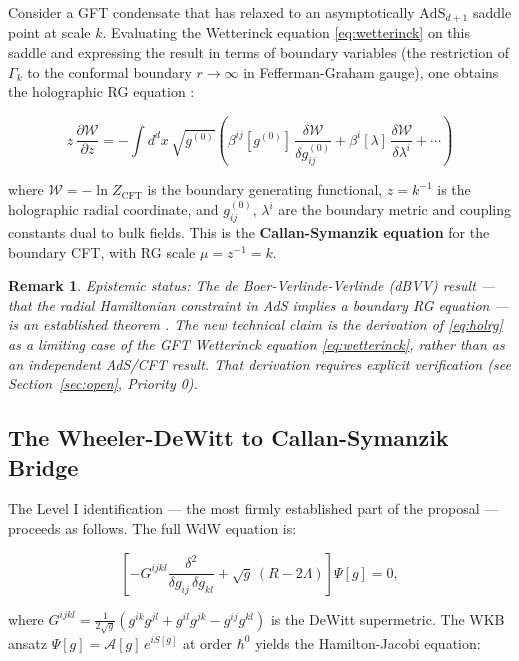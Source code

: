\documentclass[12pt,a4paper]{article}
\newtheorem{remark}{Remark}
\newcommand{\AdS}{\mathrm{AdS}}
\newcommand{\CFT}{\mathrm{CFT}}
\newcommand{\Gk}{\Gamma_k}
\begin{document}
Consider a GFT condensate that has relaxed to an asymptotically
$\AdS_{d+1}$ saddle point at scale $k$.
Evaluating the Wetterinck equation \eqref{eq:wetterinck} on this saddle
and expressing the result in terms of boundary variables
(the restriction of $\Gk$ to the conformal boundary $r\to\infty$ in
Fefferman-Graham gauge), one obtains the holographic RG equation
\cite{skenderis2002}:

\begin{equation}
\label{eq:holrg}
\boxed{
z\,\frac{\partial\mathcal{W}}{\partial z}
= -\int d^dx\,\sqrt{g^{(0)}}\!\left(
\beta^{ij}[g^{(0)}]\,\frac{\delta\mathcal{W}}{\delta g^{(0)}_{ij}}
+ \beta^i[\lambda]\,\frac{\delta\mathcal{W}}{\delta\lambda^i}
+ \cdots\right)
}
\end{equation}

where $\mathcal{W} = -\ln Z_\CFT$ is the boundary generating functional,
$z = k^{-1}$ is the holographic radial coordinate,
and $g^{(0)}_{ij}$, $\lambda^i$ are the boundary metric and coupling
constants dual to bulk fields.
This is the \textbf{Callan-Symanzik equation} for the boundary CFT,
with RG scale $\mu = z^{-1} = k$.

\begin{remark}
\emph{Epistemic status:} The de Boer-Verlinde-Verlinde (dBVV) result
— that the radial Hamiltonian constraint in AdS implies a boundary
RG equation — is an established theorem \cite{skenderis2002,witten1998}.
The \emph{new} technical claim is the derivation of \eqref{eq:holrg}
as a limiting case of the GFT Wetterinck equation \eqref{eq:wetterinck},
rather than as an independent AdS/CFT result.
That derivation requires explicit verification (see Section~\ref{sec:open},
Priority 0).
\end{remark}

\subsection{The Wheeler-DeWitt to Callan-Symanzik Bridge}
\label{sec:bridge}

The Level I identification — the most firmly established part of the
proposal — proceeds as follows.
The full WdW equation is:

\begin{equation}
\label{eq:wdw_full}
\left[-G^{ijkl}\frac{\delta^2}{\delta g_{ij}\,\delta g_{kl}}
+ \sqrt{g}\,(R - 2\Lambda)\right]\Psi[g] = 0,
\end{equation}

where
$G^{ijkl} = \tfrac{1}{2\sqrt{g}}(g^{ik}g^{jl}+g^{il}g^{jk}-g^{ij}g^{kl})$
is the DeWitt supermetric.
The WKB ansatz $\Psi[g] = \mathcal{A}[g]\,e^{iS[g]}$ at order $\hbar^0$
yields the Hamilton-Jacobi equation:
\end{document}
